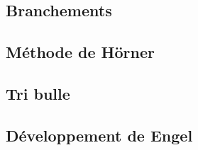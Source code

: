 

\subsection{Branchements}

\subsection{Méthode de Hörner}

\subsection{Tri bulle}

\subsection{Développement de Engel}



